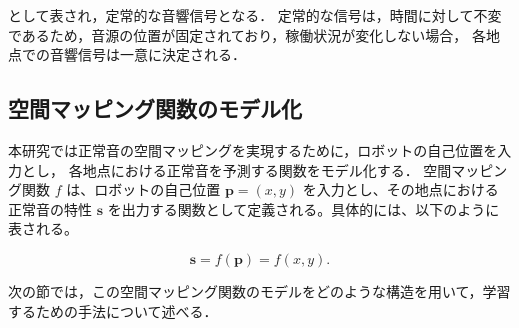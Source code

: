 \documentclass[../main]{subfiles}
\begin{document}
として表され，定常的な音響信号となる．
定常的な信号は，時間に対して不変であるため，音源の位置が固定されており，稼働状況が変化しない場合，
各地点での音響信号は一意に決定される．

\subsection{空間マッピング関数のモデル化}
本研究では正常音の空間マッピングを実現するために，ロボットの自己位置を入力とし，
各地点における正常音を予測する関数をモデル化する．
空間マッピング関数 \( f \) は、ロボットの自己位置 \( \mathbf{p} = (x, y) \) を入力とし、その地点における正常音の特性 \( \mathbf{s} \) を出力する関数として定義される。具体的には、以下のように表される。

\begin{equation}
  \mathbf{s} = f(\mathbf{p}) = f(x, y).
\end{equation}

次の節では，この空間マッピング関数のモデルをどのような構造を用いて，学習するための手法について述べる．
\end{document}
